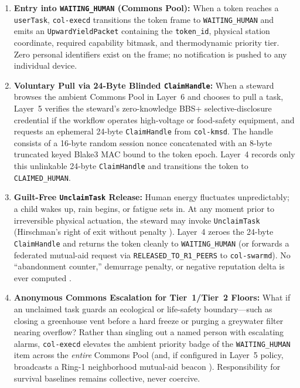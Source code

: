 \begin{enumerate}
  \item \textbf{Entry into \texttt{WAITING\_HUMAN} (Commons Pool):} When a token reaches a \texttt{userTask}, \texttt{col-execd} transitions the token frame to \texttt{WAITING\_HUMAN} and emits an \texttt{UpwardYieldPacket} containing the \texttt{token\_id}, physical station coordinate, required capability bitmask, and thermodynamic priority tier. Zero personal identifiers exist on the frame; no notification is pushed to any individual device.
  \item \textbf{Voluntary Pull via 24-Byte Blinded \texttt{ClaimHandle}:} When a steward browses the ambient Commons Pool in Layer~6 and chooses to pull a task, Layer~5 verifies the steward's zero-knowledge BBS+ selective-disclosure credential \parencite{camenisch2004signature,w3c2022vc} if the workflow operates high-voltage or food-safety equipment, and requests an ephemeral 24-byte \texttt{ClaimHandle} from \texttt{col-kmsd}. The handle consists of a 16-byte random session nonce concatenated with an 8-byte truncated keyed Blake3 MAC bound to the token epoch. Layer~4 records only this unlinkable 24-byte \texttt{ClaimHandle} and transitions the token to \texttt{CLAIMED\_HUMAN}.
  \item \textbf{Guilt-Free \texttt{UnclaimTask} Release:} Human energy fluctuates unpredictably; a child wakes up, rain begins, or fatigue sets in. At any moment prior to irreversible physical actuation, the steward may invoke \texttt{UnclaimTask} (Hirschman's right of exit without penalty \parencite{hirschman1970}). Layer~4 zeroes the 24-byte \texttt{ClaimHandle} and returns the token cleanly to \texttt{WAITING\_HUMAN} (or forwards a federated mutual-aid request via \texttt{RELEASED\_TO\_R1\_PEERS} to \texttt{col-swarmd}). No ``abandonment counter,'' demurrage penalty, or negative reputation delta is ever computed \parencite{zehr1990}.
  \item \textbf{Anonymous Commons Escalation for Tier~1/Tier~2 Floors:} What if an unclaimed task guards an ecological or life-safety boundary---such as closing a greenhouse vent before a hard freeze or purging a greywater filter nearing overflow? Rather than singling out a named person with escalating alarms, \texttt{col-execd} elevates the ambient priority badge of the \texttt{WAITING\_HUMAN} item across the \emph{entire} Commons Pool (and, if configured in Layer~5 policy, broadcasts a Ring-1 neighborhood mutual-aid beacon \parencite{kropotkin1902}). Responsibility for survival baselines remains collective, never coercive.
\end{enumerate}

